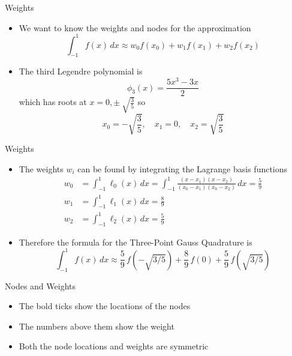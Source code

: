 \documentclass[10pt]{beamer}
\begin{document}
\begin{frame}{Weights}
\begin{itemize}
    \item We want to know the weights and nodes for the approximation
        $$\int_{-1}^1 f(x)\,dx \approx  w_0f(x_0) + w_1 f(x_1) + w_2 f(x_2)$$
    \item The third Legendre polynomial is 
        $$\phi_3(x) = \frac{5x^3 -3x}{2}$$
        which has roots at $x=0, \pm\ \sqrt{\frac{3}{5}}$ so 
        $$x_0 = -\sqrt{\frac{3}{5}},\quad x_1 = 0,\quad x_2 = \sqrt{\frac{3}{5}}$$
\end{itemize}
\end{frame}

\begin{frame}{Weights}

\begin{itemize}
    \item The weights $w_i$ can be found by integrating the Lagrange basis functions
        \begin{align*}
            w_0 &= \int_{-1}^1 \ell_0(x)\,dx = \int_{-1}^1 \frac{(x-x_1)(x-x_2)}{(x_0-x_1)(x_0-x_2)}\,dx =\frac{5}{9} \\
            w_1 &= \int_{-1}^1 \ell_1(x)\,dx =\frac{8}{9}\\
            w_2 &= \int_{-1}^1 \ell_2(x)\,dx =\frac{5}{9}
        \end{align*}
    \item Therefore the formula for the Three-Point Gauss Quadrature is 
        $$\int_{-1}^1 f(x)\,dx \approx \frac59\,f\left(-\sqrt{3/5}\right) + \frac89\, f(0) + \frac59 \,f\left(\sqrt{3/5}\right)$$
\end{itemize}
\end{frame}

\begin{frame}{Nodes and Weights}
\begin{center}
\end{center}
\begin{itemize}
    \item The bold ticks show the locations of the nodes
    \item The numbers above them show the weight
    \item Both the node locations and weights are symmetric
\end{itemize}
\end{frame}
\end{document}
